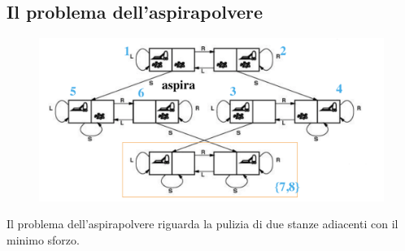 \documentclass{article}
\begin{document}
\subsection{Il problema dell'aspirapolvere}
\begin{figure}[H]
    \centering
    \includegraphics[scale=0.4]{Images/problemaaspirapolvere.png}
\end{figure}
Il problema dell'aspirapolvere riguarda la pulizia di due stanze adiacenti con il minimo sforzo.
\end{document}
